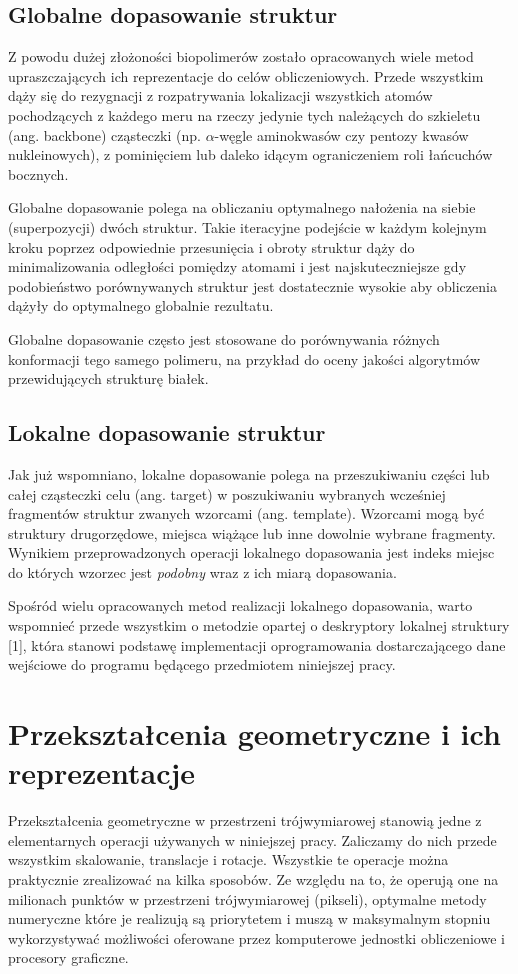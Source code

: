 \documentclass[licencjacka]{pracamgr}
\begin{document}
\subsection{Globalne dopasowanie struktur} 
Z powodu dużej złożoności biopolimerów zostało opracowanych wiele metod upraszczających ich reprezentacje do celów obliczeniowych. Przede wszystkim dąży się do rezygnacji z rozpatrywania lokalizacji wszystkich atomów pochodzących z każdego meru na rzeczy jedynie tych należących do szkieletu (ang. backbone) cząsteczki (np. $\alpha$-węgle aminokwasów czy pentozy kwasów nukleinowych), z pominięciem lub daleko idącym ograniczeniem roli łańcuchów bocznych.

Globalne dopasowanie polega na obliczaniu optymalnego nałożenia na siebie (superpozycji) dwóch struktur. Takie iteracyjne podejście w każdym kolejnym kroku poprzez odpowiednie przesunięcia i obroty struktur dąży do minimalizowania odległości pomiędzy atomami i jest najskuteczniejsze gdy podobieństwo porównywanych struktur jest dostatecznie wysokie aby obliczenia dążyły do optymalnego globalnie rezultatu.

Globalne dopasowanie często jest stosowane do porównywania różnych konformacji tego samego polimeru, na przykład do oceny jakości algorytmów przewidujących strukturę białek. 

\subsection{Lokalne dopasowanie struktur} 
Jak już wspomniano, lokalne dopasowanie polega na przeszukiwaniu części lub całej cząsteczki celu (ang. target) w poszukiwaniu wybranych wcześniej fragmentów struktur zwanych wzorcami (ang. template). Wzorcami mogą być struktury drugorzędowe, miejsca wiążące lub inne dowolnie wybrane fragmenty. Wynikiem przeprowadzonych operacji lokalnego dopasowania jest indeks miejsc do których wzorzec jest \textit{podobny} wraz z ich miarą dopasowania. 

Spośród wielu opracowanych metod realizacji lokalnego dopasowania, warto wspomnieć przede wszystkim o metodzie opartej o deskryptory lokalnej struktury [1], która stanowi podstawę implementacji oprogramowania dostarczającego dane wejściowe do programu będącego przedmiotem niniejszej pracy. 




\section{Przekształcenia geometryczne i ich reprezentacje}
Przekształcenia geometryczne w przestrzeni trójwymiarowej stanowią jedne z elementarnych operacji używanych w niniejszej pracy. Zaliczamy do nich przede wszystkim skalowanie, translacje i rotacje. Wszystkie te operacje można praktycznie zrealizować na kilka sposobów. Ze względu na to, że operują one na milionach punktów w przestrzeni trójwymiarowej (pikseli), optymalne metody numeryczne które je realizują są priorytetem i muszą w maksymalnym stopniu wykorzystywać możliwości oferowane przez komputerowe jednostki obliczeniowe i procesory graficzne. 
\end{document}
